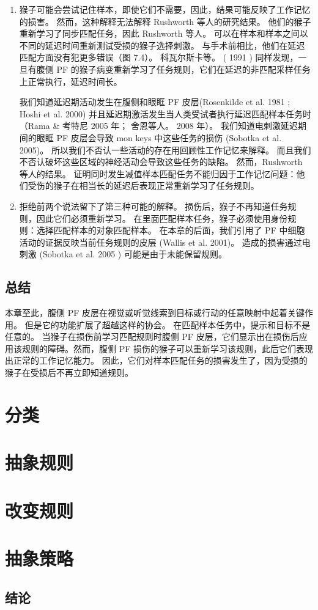 \begin{enumerate}
\item 猴子可能会尝试记住样本，即使它们不需要，因此，结果可能反映了工作记忆的损害。 然而，这种解释无法解释 Rushworth 等人的研究结果。 他们的猴子重新学习了同步匹配任务，因此 Rushworth 等人。 可以在样本和样本之间以不同的延迟时间重新测试受损的猴子选择刺激。 与手术前相比，他们在延迟匹配方面没有犯更多错误（图 7.4）。 科瓦尔斯卡等。 ( 1991 ) 同样发现，一旦有腹侧 PF 的猴子病变重新学习了任务规则，它们在延迟的非匹配采样任务上正常执行，延迟时间长。
\par
 我们知道延迟期活动发生在腹侧和眼眶 PF 皮层(Rosenkilde et al. 1981 ; Hoshi et al. 2000) 并且延迟期激活发生当人类受试者执行延迟匹配样本任务时（Rama \& 考特尼 2005 年； 舍恩等人。 2008 年）。 我们知道电刺激延迟期间的眼眶 PF 皮层会导致 mon keys 中这些任务的损伤 (Sobotka et al. 2005)。 所以我们不否认一些活动的存在用回顾性工作记忆来解释。 而且我们不否认破坏这些区域的神经活动会导致这些任务的缺陷。 然而，Rushworth 等人的结果。 证明同时发生减值样本匹配任务不能归因于工作记忆问题：他们受伤的猴子在相当长的延迟后表现正常重新学习了任务规则。
\item 拒绝前两个说法留下了第三种可能的解释。 损伤后，猴子不再知道任务规则，因此它们必须重新学习。 在里面匹配样本任务，猴子必须使用身份规则：选择匹配样本的对象匹配样本。 在本章的后面，我们引用了 PF 中细胞活动的证据反映当前任务规则的皮层 (Wallis et al. 2001)。 造成的损害通过电刺激 (Sobotka et al. 2005 ) 可能是由于未能保留规则。
\end{enumerate}
\subsection{总结}
\par 
本章至此，腹侧 PF 皮层在视觉或听觉线索到目标或行动的任意映射中起着关键作用。 但是它的功能扩展了超越这样的协会。 在匹配样本任务中，提示和目标不是任意的。 当猴子在损伤前学习匹配规则时腹侧 PF 皮层，它们显示出在损伤后应用该规则的障碍。然而，腹侧 PF 损伤的猴子可以重新学习该规则，此后它们表现出正常的工作记忆能力。 因此，它们对样本匹配任务的损害发生了，因为受损的猴子在受损后不再立即知道规则。
\section{分类}

\section{抽象规则}

\section{改变规则}

\section{抽象策略}

\subsection{结论}


